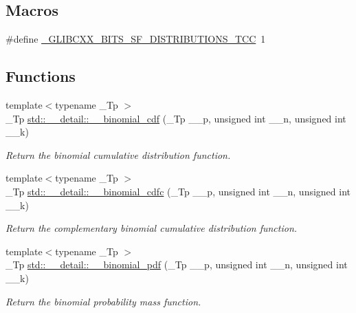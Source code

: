 \subsection*{Macros}
\begin{DoxyCompactItemize}
\item 
\#define \hyperlink{sf__distributions_8tcc_a3af0d272d6bbb6104b89109f772d6092}{\+\_\+\+G\+L\+I\+B\+C\+X\+X\+\_\+\+B\+I\+T\+S\+\_\+\+S\+F\+\_\+\+D\+I\+S\+T\+R\+I\+B\+U\+T\+I\+O\+N\+S\+\_\+\+T\+CC}~1
\end{DoxyCompactItemize}
\subsection*{Functions}
\begin{DoxyCompactItemize}
\item 
{\footnotesize template$<$typename \+\_\+\+Tp $>$ }\\\+\_\+\+Tp \hyperlink{namespacestd_1_1____detail_aefa3217863e0f50cd8f5379947cefcbd}{std\+::\+\_\+\+\_\+detail\+::\+\_\+\+\_\+binomial\+\_\+cdf} (\+\_\+\+Tp \+\_\+\+\_\+p, unsigned int \+\_\+\+\_\+n, unsigned int \+\_\+\+\_\+k)
\begin{DoxyCompactList}\small\item\em Return the binomial cumulative distribution function. \end{DoxyCompactList}\item 
{\footnotesize template$<$typename \+\_\+\+Tp $>$ }\\\+\_\+\+Tp \hyperlink{namespacestd_1_1____detail_a1fd732a432f73686c97311e6976a0e76}{std\+::\+\_\+\+\_\+detail\+::\+\_\+\+\_\+binomial\+\_\+cdfc} (\+\_\+\+Tp \+\_\+\+\_\+p, unsigned int \+\_\+\+\_\+n, unsigned int \+\_\+\+\_\+k)
\begin{DoxyCompactList}\small\item\em Return the complementary binomial cumulative distribution function. \end{DoxyCompactList}\item 
{\footnotesize template$<$typename \+\_\+\+Tp $>$ }\\\+\_\+\+Tp \hyperlink{namespacestd_1_1____detail_acaeb596397431731cba684ca1f04cbfc}{std\+::\+\_\+\+\_\+detail\+::\+\_\+\+\_\+binomial\+\_\+pdf} (\+\_\+\+Tp \+\_\+\+\_\+p, unsigned int \+\_\+\+\_\+n, unsigned int \+\_\+\+\_\+k)
\begin{DoxyCompactList}\small\item\em Return the binomial probability mass function. \end{DoxyCompactList}\item 

\end{DoxyCompactItemize}
